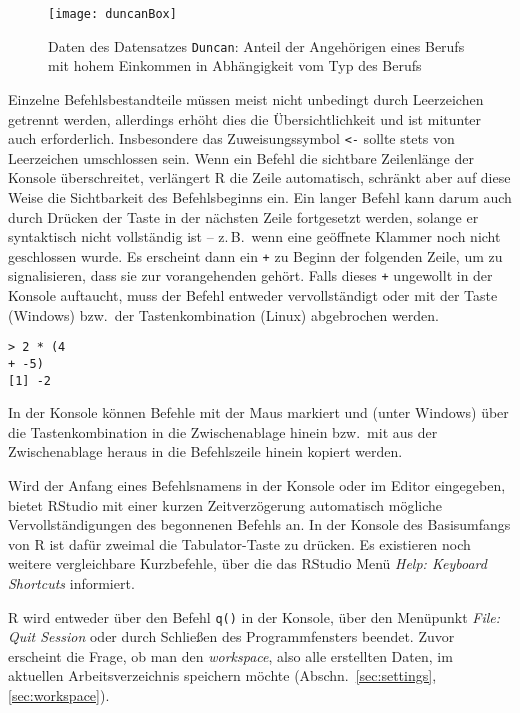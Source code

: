 \begin{figure}[ht]
\centering
\texttt{[image: duncanBox]}
\vspace*{-1em}
\caption{Daten des Datensatzes \lstinline!Duncan!: Anteil der Angehörigen eines Berufs mit hohem Einkommen in Abhängigkeit vom Typ des Berufs}
\label{fig:duncanBox}
\end{figure}

Einzelne Befehlsbestandteile müssen meist nicht unbedingt durch Leerzeichen getrennt werden, allerdings erhöht dies die Übersichtlichkeit und ist mitunter auch erforderlich. Insbesondere das Zuweisungssymbol \lstinline!<-! sollte stets von Leerzeichen umschlossen sein. Wenn ein Befehl die sichtbare Zeilenlänge der Konsole überschreitet, verlängert R die Zeile automatisch, schränkt aber auf diese Weise die Sichtbarkeit des Befehlsbeginns ein. Ein langer Befehl kann darum auch durch Drücken der  Taste in der nächsten Zeile fortgesetzt werden, solange er syntaktisch nicht vollständig ist -- z.\,B.\ wenn eine geöffnete Klammer noch nicht geschlossen wurde. Es erscheint dann ein \lstinline!+! zu Beginn der folgenden Zeile, um zu signalisieren, dass sie zur vorangehenden gehört. Falls dieses \lstinline!+! ungewollt in der Konsole auftaucht, muss der Befehl entweder vervollständigt oder mit der  Taste (Windows) bzw.\ der  Tastenkombination (Linux) abgebrochen werden.
\begin{lstlisting}
> 2 * (4
+ -5)
[1] -2
\end{lstlisting}

In der Konsole können Befehle mit der Maus markiert und (unter Windows) über die Tastenkombination  in die Zwischenablage hinein bzw.\ mit  aus der Zwischenablage heraus in die Befehlszeile hinein kopiert werden.

Wird der Anfang eines Befehlsnamens in der Konsole oder im Editor eingegeben, bietet RStudio mit einer kurzen Zeitverzögerung automatisch mögliche Vervollständigungen des begonnenen Befehls an. In der Konsole des Basisumfangs von R ist dafür zweimal die Tabulator-Taste zu drücken. Es existieren noch weitere vergleichbare Kurzbefehle, über die das RStudio Menü \emph{Help: Keyboard Shortcuts} informiert.

R wird entweder über den Befehl \lstinline!q()! in der Konsole, über den Menüpunkt \emph{File: Quit Session} oder durch Schließen des Programmfensters beendet. Zuvor erscheint die Frage, ob man den \emph{workspace}, also alle erstellten Daten, im aktuellen Arbeitsverzeichnis speichern möchte (Abschn.\ \ref{sec:settings}, \ref{sec:workspace}).

